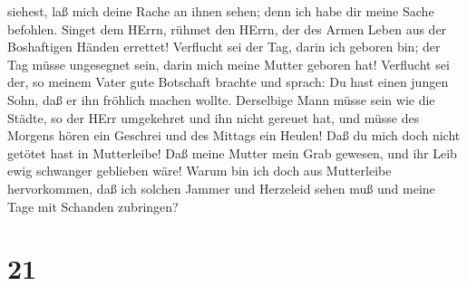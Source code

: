siehest, laß mich deine Rache an ihnen sehen; denn ich habe dir meine
Sache befohlen.  Singet dem HErrn, rühmet den HErrn, der
des Armen Leben aus der Boshaftigen Händen errettet! 
Verflucht sei der Tag, darin ich geboren bin; der Tag müsse ungesegnet
sein, darin mich meine Mutter geboren hat!  Verflucht sei
der, so meinem Vater gute Botschaft brachte und sprach: Du hast einen
jungen Sohn, daß er ihn fröhlich machen wollte.  Derselbige
Mann müsse sein wie die Städte, so der HErr umgekehret und ihn nicht
gereuet hat, und müsse des Morgens hören ein Geschrei und des Mittags
ein Heulen!  Daß du mich doch nicht getötet hast in
Mutterleibe! Daß meine Mutter mein Grab gewesen, und ihr Leib ewig
schwanger geblieben wäre!  Warum bin ich doch aus
Mutterleibe hervorkommen, daß ich solchen Jammer und Herzeleid sehen muß
und meine Tage mit Schanden zubringen?

\hypertarget{section-20}{%
\section{21}\label{section-20}}

